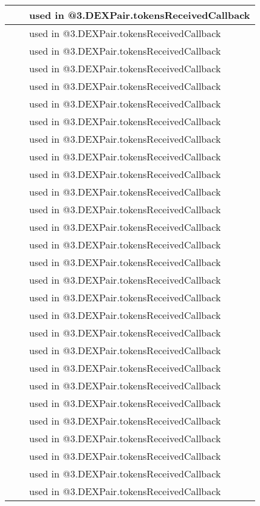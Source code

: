 \begin{tabular}{|l|l|p{5cm}|}
 & & used in @3.DEXPair.tokensReceivedCallback\\\hline
 & & used in @3.DEXPair.tokensReceivedCallback\\\hline
 & & used in @3.DEXPair.tokensReceivedCallback\\\hline
 & & used in @3.DEXPair.tokensReceivedCallback\\\hline
 & & used in @3.DEXPair.tokensReceivedCallback\\\hline
 & & used in @3.DEXPair.tokensReceivedCallback\\\hline
 & & used in @3.DEXPair.tokensReceivedCallback\\\hline
 & & used in @3.DEXPair.tokensReceivedCallback\\\hline
 & & used in @3.DEXPair.tokensReceivedCallback\\\hline
 & & used in @3.DEXPair.tokensReceivedCallback\\\hline
 & & used in @3.DEXPair.tokensReceivedCallback\\\hline
 & & used in @3.DEXPair.tokensReceivedCallback\\\hline
 & & used in @3.DEXPair.tokensReceivedCallback\\\hline
 & & used in @3.DEXPair.tokensReceivedCallback\\\hline
 & & used in @3.DEXPair.tokensReceivedCallback\\\hline
 & & used in @3.DEXPair.tokensReceivedCallback\\\hline
 & & used in @3.DEXPair.tokensReceivedCallback\\\hline
 & & used in @3.DEXPair.tokensReceivedCallback\\\hline
 & & used in @3.DEXPair.tokensReceivedCallback\\\hline
 & & used in @3.DEXPair.tokensReceivedCallback\\\hline
 & & used in @3.DEXPair.tokensReceivedCallback\\\hline
 & & used in @3.DEXPair.tokensReceivedCallback\\\hline
 & & used in @3.DEXPair.tokensReceivedCallback\\\hline
 & & used in @3.DEXPair.tokensReceivedCallback\\\hline
 & & used in @3.DEXPair.tokensReceivedCallback\\\hline
 & & used in @3.DEXPair.tokensReceivedCallback\\\hline
 & & used in @3.DEXPair.tokensReceivedCallback\\\hline
 & & used in @3.DEXPair.tokensReceivedCallback\\\hline

\end{tabular}
